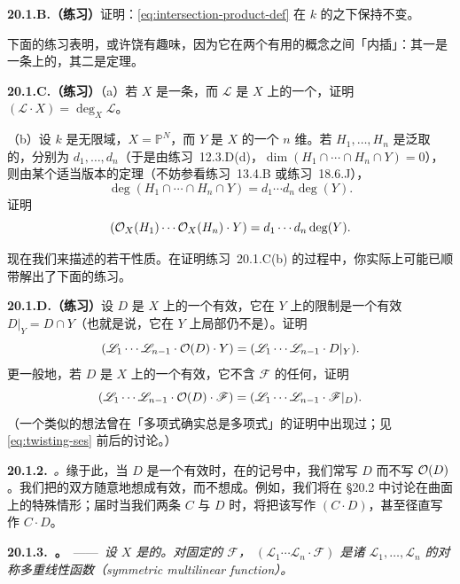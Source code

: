\textbf{20.1.B.（练习）}\quad 证明：\trIntersectionProduct \eqref{eq:intersection-product-def} 在 $k$ 的\trFieldExtension{}之下保持不变。

下面的练习表明，\trIntersectionProduct{}或许饶有趣味，因为它在两个有用的概念之间「内插」：其一是一条\trCurve{}上\trLineBundle{}的\trDegree，其二是\trBezout{}定理。

\textbf{20.1.C.（练习）}\quad（a）若 $X$ 是一条\trProjective{}\trCurve，而 $\mathscr{L}$ 是 $X$ 上的一个\trInvertibleSheaf，证明 $(\mathscr{L}\cdot X)=\deg_X\mathscr{L}$。

（b）设 $k$ 是无限域，$X=\mathbb{P}^N$，而 $Y$ 是 $X$ 的一个 $n$ 维\trSubvariety。若 $H_1,\dots,H_n$ 是泛取的\trHypersurface，\trDegree{}分别为 $d_1,\dots,d_n$（于是由\mbox{练习~12.3.D(d)}，$\dim(H_1\cap\cdots\cap H_n\cap Y)=0$），则由某个适当版本的\trBezout{}定理（不妨参看\mbox{练习~13.4.B} 或\mbox{练习~18.6.J}），
\[
\deg(H_1\cap\cdots\cap H_n\cap Y)=d_1\cdots d_n\deg(Y).
\]
证明
\[
(\mathcal{O}_X(H_1)\cdots\mathcal{O}_X(H_n)\cdot Y)=d_1\cdots d_n\deg(Y).
\]

现在我们来描述\trIntersectionProduct{}的若干性质。在证明\mbox{练习~20.1.C(b)} 的过程中，你实际上可能已顺带解出了下面的练习。

\textbf{20.1.D.（练习）}\quad 设 $D$ 是 $X$ 上的一个有效\trCartierDivisor，它在 $Y$ 上的限制是一个有效\trCartierDivisor{} $D|_Y=D\cap Y$（也就是说，它在 $Y$ 上局部仍不是\trZerodivisor）。证明
\[
(\mathscr{L}_1\cdots\mathscr{L}_{n-1}\cdot\mathcal{O}(D)\cdot Y)=(\mathscr{L}_1\cdots\mathscr{L}_{n-1}\cdot D|_Y).
\]
更一般地，若 $D$ 是 $X$ 上的一个有效\trCartierDivisor，它不含 $\mathscr{F}$ 的任何\trAssociatedPoint，证明
\[
(\mathscr{L}_1\cdots\mathscr{L}_{n-1}\cdot\mathcal{O}(D)\cdot\mathscr{F})=(\mathscr{L}_1\cdots\mathscr{L}_{n-1}\cdot\mathscr{F}|_D).
\]
（一个类似的想法曾在「\trHilbert{}多项式确实总是多项式」的证明中出现过；见 \eqref{eq:twisting-ses} 前后的讨论。）

\textbf{20.1.2.}\ \emph{\trhDefinition{}。}\quad 缘于此，当 $D$ 是一个有效\trCartierDivisor{}时，在\trIntersectionProduct{}的记号中，我们常写 $D$ 而不写 $\mathcal{O}(D)$。我们把\trIntersection{}的双方随意地想成有效\trCartierDivisor，而不想成\trLineBundle。例如，我们将在 \S20.2 中讨论\trIntersectionTheory{}在曲面上的特殊情形；届时当我们\trIntersection{}两条\trCurve{} $C$ 与 $D$ 时，将把该\trIntersection{}写作 $(C\cdot D)$，甚至径直写作 $C\cdot D$。

\textbf{20.1.3.\ \trhProposition。}\ ——\ \emph{设 $X$ 是\trProjective{}的。对固定的 $\mathscr{F}$，\trIntersectionProduct{} $(\mathscr{L}_1\cdots\mathscr{L}_n\cdot\mathscr{F})$ 是诸 $\mathscr{L}_1,\dots,\mathscr{L}_n$ 的对称多重线性函数（symmetric multilinear function）。}

